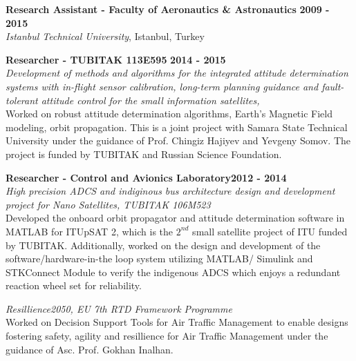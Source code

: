 \documentclass[margin,line]{res}
\begin{document}
\begin{resume}
{\bf Research Assistant - Faculty of Aeronautics \& Astronautics} \hfill {\bf 2009 - 2015}\\
{\em Istanbul Technical University}, Istanbul, Turkey

{\bf Researcher - TUBITAK 113E595 }\hfill {\bf 2014 - 2015}\\
{\em Development of methods and algorithms for the integrated attitude
determination systems with in-flight sensor calibration, long-term 
planning guidance and fault-tolerant attitude control for the small 
information satellites, }  \\
Worked on robust attitude determination algorithms, Earth's Magnetic Field modeling, orbit propagation. This is a joint project with Samara State Technical University under the guidance of Prof. Chingiz Hajiyev and Yevgeny Somov. The project is funded by TUBITAK and Russian Science Foundation.
\vspace*{-.05in}


{\bf Researcher - Control and Avionics Laboratory}\hfill {\bf 2012 - 2014}\\ 
{\em High precision ADCS and indiginous bus architecture design and development project for Nano Satellites, TUBITAK 106M523}\\
Developed the onboard orbit propagator and attitude determination software in MATLAB for ITUpSAT 2, which is the  $2^{nd}$ small satellite project of ITU funded by TUBITAK. Additionally, worked on the design and development of the software/hardware-in-the loop system utilizing MATLAB/ 
Simulink and STKConnect Module to verify the indigenous ADCS which enjoys a redundant reaction wheel set for reliability.
\vspace*{-.05in}

{\em Resillience2050, EU 7th RTD Framework Programme }  \\
Worked on Decision Support Tools for Air Traffic Management to enable designs fostering safety, agility and resillience for Air Traffic Management under the guidance of Asc. Prof. Gokhan Inalhan. 
\vspace*{-.2in}


\end{resume}
\end{document}
